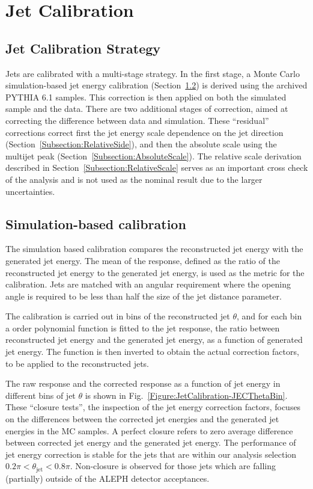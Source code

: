 \section{Jet Calibration}\label{Section:JetCalibration}

\subsection{Jet Calibration Strategy}

Jets are calibrated with a multi-stage strategy.  In the first stage, a Monte Carlo simulation-based jet energy calibration (Section~\ref{Subsection:MCCalibration}) is derived using the archived PYTHIA 6.1 samples.  This correction is then applied on both the simulated sample and the data. There are two additional stages of correction, aimed at correcting the difference between data and simulation.  These ``residual'' corrections correct first the jet energy scale dependence on the jet direction (Section~\ref{Subsection:RelativeSide}), and then the absolute scale using the multijet peak (Section~\ref{Subsection:AbsoluteScale}).  The relative scale derivation described in Section~\ref{Subsection:RelativeScale} serves as an important cross check of the analysis and is not used as the nominal result due to the larger uncertainties.

\subsection{Simulation-based calibration}
\label{Subsection:MCCalibration}

The simulation based calibration compares the reconstructed jet energy with the generated jet energy.  The mean of the response, defined as the ratio of the reconstructed jet energy to the generated jet energy, is used as the metric for the calibration.
Jets are matched with an angular requirement where the opening angle is required to be less than half the size of the jet distance parameter.

The calibration is carried out in bins of the reconstructed jet $\theta$, and for each bin a  order polynomial function is fitted to the jet response, the ratio between reconstructed jet energy and the generated jet energy, as a function of generated jet energy.  The function is then inverted to obtain the actual correction factors, to be applied to the reconstructed jets.

The raw response and the corrected response as a function of jet energy in different bins of jet $\theta$ is shown in Fig.~\ref{Figure:JetCalibration-JECThetaBin}. These ``closure tests'', the inspection of the jet energy correction factors, focuses on the differences between the corrected jet energies and the generated jet energies in the MC samples. A perfect closure refers to zero average difference between corrected jet energy and the generated jet energy. The performance of jet energy correction is stable for the jets that are within our analysis selection $0.2\pi < \theta_\text{jet} < 0.8\pi$. Non-closure is observed for those jets which are falling (partially) outside of the ALEPH detector acceptances.

